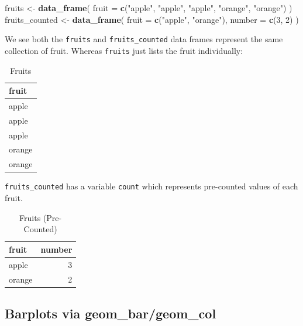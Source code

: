 \documentclass[12pt,]{krantz}
\makeatletter
\newenvironment{Shaded}{\begin{snugshade}}{\end{snugshade}}
\newcommand{\KeywordTok}[1]{\textcolor[rgb]{0.27,0.27,0.27}{\textbf{#1}}}
\newcommand{\DataTypeTok}[1]{\textcolor[rgb]{0.27,0.27,0.27}{#1}}
\newcommand{\DecValTok}[1]{\textcolor[rgb]{0.06,0.06,0.06}{#1}}
\newcommand{\StringTok}[1]{\textcolor[rgb]{0.5,0.5,0.5}{#1}}
\newcommand{\NormalTok}[1]{#1}
\newenvironment{kframe}{%
\medskip{}
\setlength{\fboxsep}{.8em}
 \def\at@end@of@kframe{}%
 \ifinner\ifhmode%
  \def\at@end@of@kframe{\end{minipage}}%
  \begin{minipage}{\columnwidth}%
 \fi\fi%
 \def\FrameCommand##1{\hskip\@totalleftmargin \hskip-\fboxsep
 \colorbox{shadecolor}{##1}\hskip-\fboxsep
     \hskip-\linewidth \hskip-\@totalleftmargin \hskip\columnwidth}%
 \MakeFramed {\advance\hsize-\width
   \@totalleftmargin\z@ \linewidth\hsize
   \@setminipage}}%
 {\par\unskip\endMakeFramed%
 \at@end@of@kframe}
\renewenvironment{Shaded}{\begin{kframe}}{\end{kframe}}
\theoremstyle{definition}
\theoremstyle{definition}
\theoremstyle{definition}
\theoremstyle{remark}
\makeatother
\begin{document}
\begin{Shaded}
\begin{Highlighting}[]
\NormalTok{fruits <-}\StringTok{ }\KeywordTok{data_frame}\NormalTok{(}
  \DataTypeTok{fruit =} \KeywordTok{c}\NormalTok{(}\StringTok{"apple"}\NormalTok{, }\StringTok{"apple"}\NormalTok{, }\StringTok{"apple"}\NormalTok{, }\StringTok{"orange"}\NormalTok{, }\StringTok{"orange"}\NormalTok{)}
\NormalTok{)}
\NormalTok{fruits_counted <-}\StringTok{ }\KeywordTok{data_frame}\NormalTok{(}
  \DataTypeTok{fruit =} \KeywordTok{c}\NormalTok{(}\StringTok{"apple"}\NormalTok{, }\StringTok{"orange"}\NormalTok{),}
  \DataTypeTok{number =} \KeywordTok{c}\NormalTok{(}\DecValTok{3}\NormalTok{, }\DecValTok{2}\NormalTok{)}
\NormalTok{)}
\end{Highlighting}
\end{Shaded}

We see both the \texttt{fruits} and \texttt{fruits\_counted} data frames
represent the same collection of fruit. Whereas \texttt{fruits} just
lists the fruit individually:

\begin{table}[H]

\caption{\label{tab:fruits}Fruits}
\centering
\fontsize{10}{12}\selectfont
\begin{tabular}[t]{l}
\toprule
fruit\\
\midrule
apple\\
apple\\
apple\\
orange\\
orange\\
\bottomrule
\end{tabular}
\end{table}

\texttt{fruits\_counted} has a variable \texttt{count} which represents
pre-counted values of each fruit.

\begin{table}[H]

\caption{\label{tab:fruitscounted}Fruits (Pre-Counted)}
\centering
\fontsize{10}{12}\selectfont
\begin{tabular}[t]{lr}
\toprule
fruit & number\\
\midrule
apple & 3\\
orange & 2\\
\bottomrule
\end{tabular}
\end{table}

\subsection{Barplots via
geom\_bar/geom\_col}\label{barplots-via-geom_bargeom_col}
\end{document}
